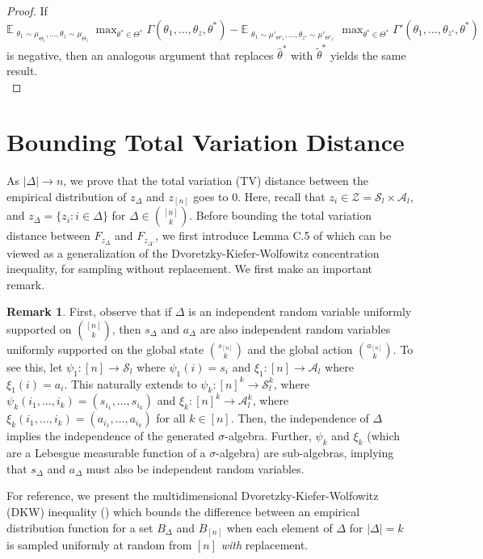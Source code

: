 \documentclass{article}
\theoremstyle{plain}
\theoremstyle{definition}
\newtheorem{remark}[theorem]{Remark}
\def\E{\mathbb{E}}
\begin{document}
\begin{proof}
If $\E_{\substack{\theta_1\sim \mu_{\Theta_1}, \dots, \theta_z\sim\mu_{\Theta_z}}} \max_{\theta^*\in\Theta^*} \Gamma(\theta_1,\dots,\theta_z,\theta^*) - \E_{\substack{\theta_1\sim \mu'_{\Theta'_1}, \dots, \theta_{z'}\sim\mu'_{\Theta'_{z'}}}}\max_{{\theta}^{*}\in\Theta^*} \Gamma'(\theta_1,\dots,\theta_{z'},\theta^*)$ is negative, then an analogous argument that replaces $\hat{\theta}^*$ with $\tilde{\theta}^*$ yields the same result. \qedhere \\
\end{proof}


\section{Bounding Total Variation Distance}
\label{sec: proof of tv bound}
As $|\Delta|\to n$, we prove that the total variation (TV) distance between the empirical distribution of $z_\Delta$ and $z_{[n]}$ goes to $0$. Here, recall that $z_i\in\mathcal{Z}=\mathcal{S}_l\times\mathcal{A}_l$, and $z_\Delta = \{z_i: i\in\Delta\}$ for $\Delta\in {[n]\choose k}$. Before bounding the total variation distance between $F_{z_\Delta}$ and $F_{z_{\Delta'}}$, we first introduce Lemma C.5 of \citet{anand2024efficient} which can be viewed as a generalization of the Dvoretzky-Kiefer-Wolfowitz concentration inequality, for sampling without replacement. We first make an important remark.


\begin{remark} First, observe that if $\Delta$ is an independent random variable uniformly supported on ${[n]\choose k}$, then $s_{\Delta}$ and $a_\Delta$ are also independent random variables uniformly supported on the global state ${s_{[n]} \choose k}$ and the global action ${a_{[n]}\choose k}$. To see this, let $\psi_1:[n]\to \mathcal{S}_l$ where $\psi_1(i) = s_i$ and $\xi_1:[n]\to\mathcal{A}_l$ where $\xi_1(i) = a_i$. This naturally extends to $\psi_k: [n]^k\to \mathcal{S}_l^k$, where $\psi_k(i_1,\dots,i_k) = (s_{i_1},\dots,s_{i_k})$ and $\xi_k:[n]^k\to\mathcal{A}_l^k$, where $\xi_k(i_1,\dots,i_k) = (a_{i_1},\dots,a_{i_k})$ for all $k\in[n]$. Then, the independence of $\Delta$ implies the independence of the generated $\sigma$-algebra. Further, $\psi_k$ and $\xi_k$ (which are a Lebesgue measurable function of a $\sigma$-algebra) are sub-algebras, implying that $s_\Delta$ and $a_\Delta$ must also be independent random variables. \end{remark}

For reference, we present the multidimensional Dvoretzky-Kiefer-Wolfowitz (DKW) inequality (\cite{10.1214/aoms/1177728174,10.1214/aop/1176990746,NAAMAN2021109088}) which bounds the difference between an empirical distribution function for a set $B_\Delta$ and $B_{[n]}$ when each element of $\Delta$ for $|\Delta|=k$ is sampled uniformly at random from $[n]$ \emph{with} replacement.
\end{document}
